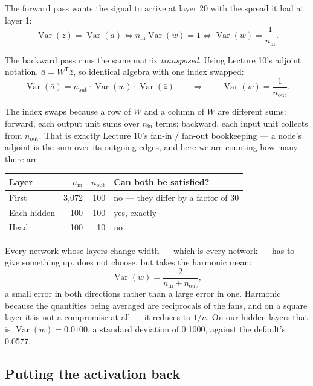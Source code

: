 \documentclass[11pt,a4paper]{article}
\begin{document}
The forward pass wants the signal to arrive at layer 20 with the spread it had
at layer 1:
\[ \operatorname{Var}(z) = \operatorname{Var}(a)
   \iff n_{\text{in}}\operatorname{Var}(w) = 1
   \iff \operatorname{Var}(w) = \frac{1}{n_{\text{in}}}. \]

The backward pass runs the same matrix \emph{transposed}. Using Lecture 10's
adjoint notation, $\bar a = W^{\mathsf T}\bar z$, so identical algebra with one
index swapped:
\[ \operatorname{Var}(\bar a)
   = n_{\text{out}}\cdot\operatorname{Var}(w)\cdot\operatorname{Var}(\bar z)
   \qquad\Longrightarrow\qquad
   \operatorname{Var}(w) = \frac{1}{n_{\text{out}}}. \]

The index swaps because a row of $W$ and a column of $W$ are different sums:
forward, each output unit sums over $n_{\text{in}}$ terms; backward, each input
unit collects from $n_{\text{out}}$. That is exactly Lecture 10's fan-in /
fan-out bookkeeping --- a node's adjoint is the sum over its outgoing edges,
and here we are counting how many there are.

\begin{center}
\small
\begin{tabular}{lrrl}
\toprule
\textbf{Layer} & $n_{\text{in}}$ & $n_{\text{out}}$ &
\textbf{Can both be satisfied?} \\
\midrule
First & 3{,}072 & 100 & no --- they differ by a factor of 30 \\
Each hidden & 100 & 100 & yes, exactly \\
Head & 100 & 10 & no \\
\bottomrule
\end{tabular}
\end{center}

Every network whose layers change width --- which is every network --- has to
give something up.  does not choose, but takes the harmonic mean:
\[ \operatorname{Var}(w) = \frac{2}{n_{\text{in}} + n_{\text{out}}}, \]
a small error in both directions rather than a large error in one. Harmonic
because the quantities being averaged are reciprocals of the fans, and on a
square layer it is not a compromise at all --- it reduces to $1/n$. On our
hidden layers that is $\operatorname{Var}(w) = 0.0100$, a standard deviation of
0.1000, against the default's 0.0577.

\subsection{Putting the activation back}
\end{document}
